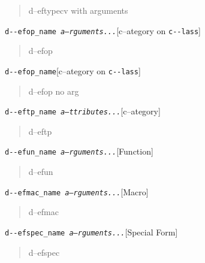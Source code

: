 \documentclass{book}
\begin{document}
\begin{titlepage}
%
\begin{quote}
d--eftypecv with arguments
\end{quote}

\noindent\texttt{d{-}{-}efop\_name \EmbracOn{}\textnormal{\textsl{a--rguments...}}\EmbracOff{}}\hfill[c--ategory on \texttt{c{-}{-}lass}]



%
\begin{quote}
d--efop
\end{quote}

\noindent\texttt{d{-}{-}efop\_name}\hfill[c--ategory on \texttt{c{-}{-}lass}]



%
\begin{quote}
d--efop no arg
\end{quote}

\noindent\texttt{d{-}{-}eftp\_name \EmbracOn{}\textnormal{\textsl{a--ttributes...}}\EmbracOff{}}\hfill[c--ategory]



%
\begin{quote}
d--eftp
\end{quote}

\noindent\texttt{d{-}{-}efun\_name \EmbracOn{}\textnormal{\textsl{a--rguments...}}\EmbracOff{}}\hfill[Function]



%
\begin{quote}
d--efun
\end{quote}

\noindent\texttt{d{-}{-}efmac\_name \EmbracOn{}\textnormal{\textsl{a--rguments...}}\EmbracOff{}}\hfill[Macro]



%
\begin{quote}
d--efmac
\end{quote}

\noindent\texttt{d{-}{-}efspec\_name \EmbracOn{}\textnormal{\textsl{a--rguments...}}\EmbracOff{}}\hfill[Special Form]



%
\begin{quote}
d--efspec
\end{quote}


\end{titlepage}
\end{document}
